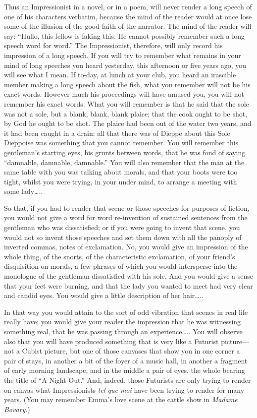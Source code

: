Thus an Impressionist in a novel, or in a poem, will never render a long
speech of one of his characters verbatim, because the mind of the reader
would at once lose some of the illusion of the good faith of the
narrator. The mind of the reader will say: ``Hullo, this fellow is
faking this. He cannot possibly remember such a long speech word for
word.'' The Impressionist, therefore, will only record his impression of
a long speech. If you will try to remember what remains in your mind of
long speeches you heard yesterday, this afternoon or five years ago, you
will see what I mean. If to-day, at lunch at your club, you heard an
irascible member making a long speech about the fish, what you remember
will not be his exact words. However much his proceedings will have
amused you, you will not remember his exact words. What you will
remember is that he said that the sole was not a sole, but a blank,
blank, blank plaice; that the cook ought to be shot, by God he ought to
be shot. The plaice had been out of the water two years, and it had been
caught in a drain: all that there was of Dieppe about this Sole
Dieppoise was something that you cannot remember. You will remember this
gentleman's starting eyes, his grunts between words, that he was fond of
saying ``damnable, damnable, damnable.'' You will also remember that the
man at the same table with you was talking about morals, and that your
boots were too tight, whilst you were trying, in your under mind, to
arrange a meeting with some lady\ldots{}..

So that, if you had to render that scene or those speeches for purposes
of fiction, you would not give a word for word re-invention of sustained
sentences from the gentleman who was dissatisfied; or if you were going
to invent that scene, you would not so invent those speeches and set
them down with all the panoply of inverted commas, notes of exclamation.
No, you would give an impression of the whole thing, of the snorts, of
the characteristic exclamation, of your friend's disquisition on morals,
a few phrases of which you would intersperse into the monologue of the
gentleman dissatisfied with his sole. And you would give a sense that
your feet were burning, and that the lady you wanted to meet had very
clear and candid eyes. You would give a little description of her
hair\ldots{}..

In that way you would attain to the sort of odd vibration that scenes in
real life really have; you would give your reader the impression that he
was witnessing something real, that he was passing through an
experience\ldots{}.. You will observe also that you will have produced
something that is very like a Futurist picture---not a Cubist picture,
but one of those canvases that show you in one corner a pair of stays,
in another a bit of the foyer of a music hall, in another a fragment of
early morning landscape, and in the middle a pair of eyes, the whole
bearing the title of ``A Night Out.'' And, indeed, those Futurists are
only trying to render on canvas what Impressionists \emph{tel que moi}
have been trying to render for many years. (You may remember Emma's love
scene at the cattle show in \emph{Madame Bovary}.)

